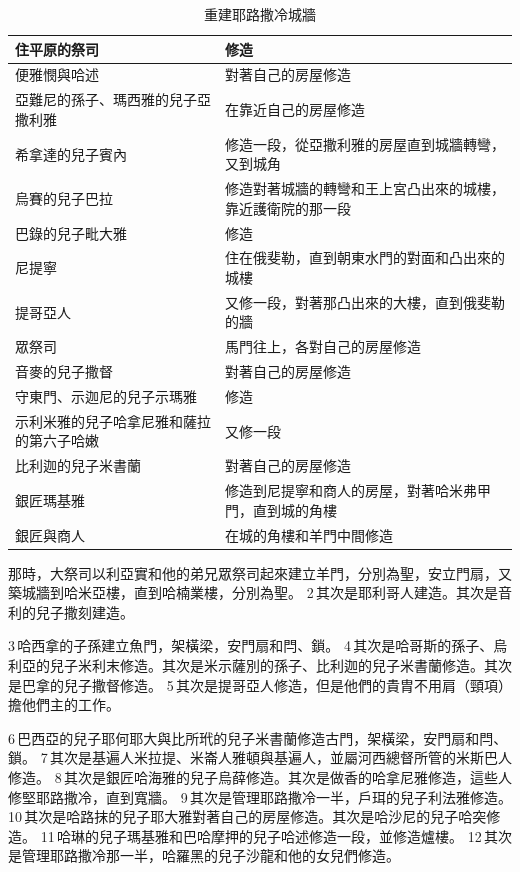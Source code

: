 \begin{table}[H]
\centering 
\begin{tabular}{p{7cm}|p{8cm}}\hline\hline
住平原的祭司&修造\\\hline
便雅憫與哈述&對著自己的房屋修造\\\hline
亞難尼的孫子、瑪西雅的兒子亞撒利雅&在靠近自己的房屋修造\\\hline
希拿達的兒子賓內&修造一段，從亞撒利雅的房屋直到城牆轉彎，又到城角\\\hline
烏賽的兒子巴拉&修造對著城牆的轉彎和王上宮凸出來的城樓，靠近護衛院的那一段\\\hline
巴錄的兒子毗大雅&修造\\\hline
尼提寧&住在俄斐勒，直到朝東水門的對面和凸出來的城樓\\\hline
提哥亞人&又修一段，對著那凸出來的大樓，直到俄斐勒的牆\\\hline
眾祭司&馬門往上，各對自己的房屋修造\\\hline
音麥的兒子撒督&對著自己的房屋修造\\\hline
守東門、示迦尼的兒子示瑪雅&修造\\\hline
示利米雅的兒子哈拿尼雅和薩拉的第六子哈嫩&又修一段\\\hline
比利迦的兒子米書蘭&對著自己的房屋修造\\\hline
銀匠瑪基雅&修造到尼提寧和商人的房屋，對著哈米弗甲門，直到城的角樓\\\hline
銀匠與商人&在城的角樓和羊門中間修造\\\hline
\end{tabular}
\caption{重建耶路撒冷城牆}
\end{table}
那時，大祭司以利亞實和他的弟兄眾祭司起來建立羊門，分別為聖，安立門扇，又築城牆到哈米亞樓，直到哈楠業樓，分別為聖。 2 其次是耶利哥人建造。其次是音利的兒子撒刻建造。

3 哈西拿的子孫建立魚門，架橫梁，安門扇和閂、鎖。 4 其次是哈哥斯的孫子、烏利亞的兒子米利末修造。其次是米示薩別的孫子、比利迦的兒子米書蘭修造。其次是巴拿的兒子撒督修造。 5 其次是提哥亞人修造，但是他們的貴胄不用肩（頸項）擔他們主的工作。

6 巴西亞的兒子耶何耶大與比所玳的兒子米書蘭修造古門，架橫梁，安門扇和閂、鎖。 7 其次是基遍人米拉提、米崙人雅頓與基遍人，並屬河西總督所管的米斯巴人修造。 8 其次是銀匠哈海雅的兒子烏薛修造。其次是做香的哈拿尼雅修造，這些人修堅耶路撒冷，直到寬牆。 9 其次是管理耶路撒冷一半，戶珥的兒子利法雅修造。 10 其次是哈路抹的兒子耶大雅對著自己的房屋修造。其次是哈沙尼的兒子哈突修造。 11 哈琳的兒子瑪基雅和巴哈摩押的兒子哈述修造一段，並修造爐樓。 12 其次是管理耶路撒冷那一半，哈羅黑的兒子沙龍和他的女兒們修造。

